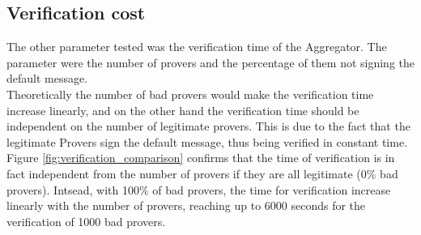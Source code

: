 \subsection{Verification cost}
The other parameter tested was the verification time of the Aggregator. 
The parameter were the number of provers and the percentage of them not signing the default message.\\
Theoretically the number of bad provers would make the verification time increase linearly, and on the other hand the verification time should be independent on the number of legitimate provers.
This is due to the fact that the legitimate Provers sign the default message, thus being verified in constant time.\\
Figure \ref{fig:verification_comparison} confirms that the time of verification is in fact independent from the number of provers if they are all legitimate (0\% bad provers).
Intsead, with 100\% of bad provers, the time for verification increase linearly with the number of provers, reaching up to 6000 seconds for the verification of 1000 bad provers.

